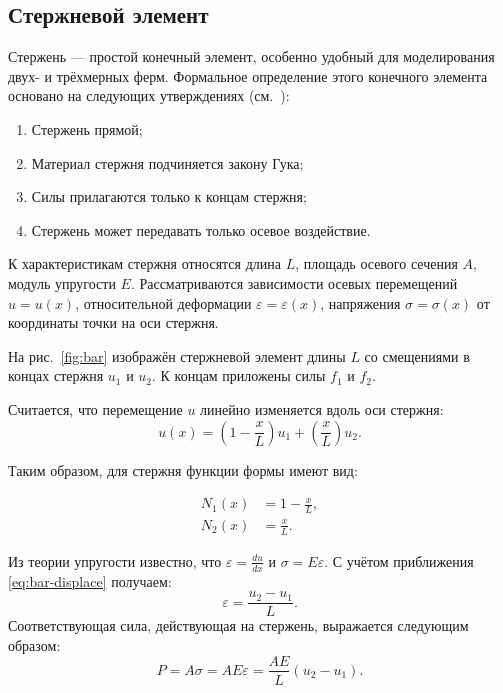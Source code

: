 \documentclass[10pt]{article}
\numberwithin{equation}{section}
\renewcommand{\epsilon}{\varepsilon}
\newcommand{\figref}[1]{рис. \ref{#1}}
\begin{document}
\subsection{Стержневой элемент}
\label{sec:bar}

Стержень — простой конечный элемент, особенно удобный для
моделирования двух- и трёхмерных ферм. Формальное определение этого
конечного элемента основано на следующих утверждениях
(см. \cite{hutton04}):

\begin{enumerate}
\item Стержень прямой;

\item Материал стержня подчиняется закону Гука;

\item Силы прилагаются только к концам стержня;

\item Стержень может передавать только осевое воздействие.
\end{enumerate}

К характеристикам стержня относятся длина $L$, площадь осевого
сечения $A$, модуль упругости $E$. Рассматриваются зависимости осевых
перемещений $u = u(x)$, относительной деформации $\epsilon =
\epsilon(x)$, напряжения $\sigma = \sigma(x)$ от координаты точки на
оси стержня.



На \figref{fig:bar} изображён стержневой элемент длины $L$ со
смещениями в концах стержня $u_1$ и $u_2$. К концам приложены силы
$f_1$ и $f_2$.

Считается, что перемещение $u$ линейно изменяется вдоль оси стержня:
\begin{equation}
  \label{eq:bar-displace}
  u(x) = \left( 1 - \frac{x}{L} \right) u_1 + \left( \frac{x}{L}
  \right) u_2.
\end{equation}

Таким образом, для стержня функции формы имеют вид:

\begin{equation}
  \label{eq:bar-shape}
  \begin{aligned}
    N_1(x) &= 1 - \frac{x}{L},\\
    N_2(x) &= \frac{x}{L}.
  \end{aligned}
\end{equation}

Из теории упругости известно, что $\epsilon = \frac{du}{dx}$ и $\sigma
= E\epsilon$. С учётом приближения \eqref{eq:bar-displace} получаем:
\begin{equation}
  \label{eq:bar-strain}
  \epsilon = \frac{u_2-u_1}{L}.
\end{equation}
Соответствующая сила, действующая на стержень, выражается следующим
образом:
\begin{equation*}
  P = A\sigma = AE\epsilon = \frac{AE}{L}(u_2-u_1).
\end{equation*}
\end{document}
